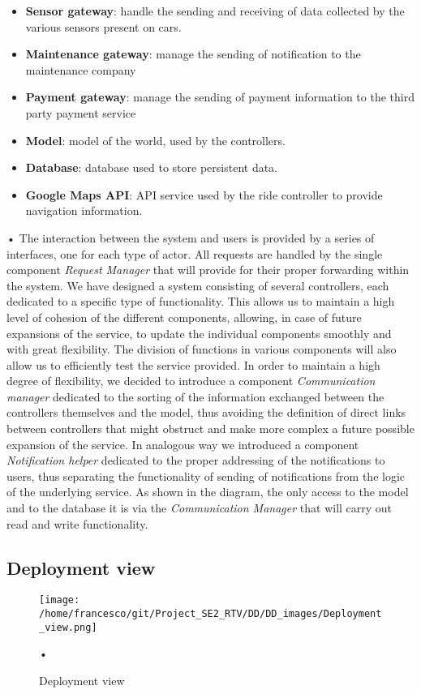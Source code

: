 \documentclass[10pt, a4paper,titlepage]{article}
\begin{document}
\begin{itemize}
\item \textbf{Sensor gateway}: handle the sending and receiving of data collected by the various sensors present on cars.
\item \textbf{Maintenance gateway}: manage the sending of notification to the maintenance company
\item \textbf{Payment gateway}: manage the sending of payment information to the third party payment service
\item \textbf{Model}: model of the world, used by the controllers.
\item \textbf{Database}: database used to store persistent data.
\item \textbf{Google Maps API}: API service used by the ride controller to provide navigation information.
\end{itemize}•
The interaction between the system and users is provided by a series of interfaces, one for each type of actor. All requests are handled by the single component \emph{Request Manager} that will provide for their proper forwarding within the system. We have designed a system consisting of several controllers, each dedicated to a specific type of functionality. This allows us to maintain a high level of cohesion of the different components, allowing, in case of future expansions of the service, to update the individual components smoothly and with great flexibility. The division of functions in various components will also allow us to efficiently test the service provided. In order to maintain a high degree of flexibility, we decided to introduce a component \emph{Communication manager} dedicated to the sorting of the information exchanged between the controllers themselves and the model, thus avoiding the definition of direct links between controllers that might obstruct and make more complex a future possible expansion of the service.
In analogous way we introduced a component \emph{Notification helper} dedicated to the proper addressing of the notifications to users, thus separating the functionality of sending of notifications from the logic of the underlying service.
As shown in the diagram, the only access to the model and to the database it is via the \emph{Communication Manager} that will carry out read and write functionality.
\newpage
\subsection{Deployment view}
\begin{figure}[h]
\begin{center}
\texttt{[image: /home/francesco/git/Project\_SE2\_RTV/DD/DD\_images/Deployment\_view.png]}
\caption{Deployment view}
\label{fig:deployment_view}
\end{center}•
\end{figure}
\newpage
\end{document}
